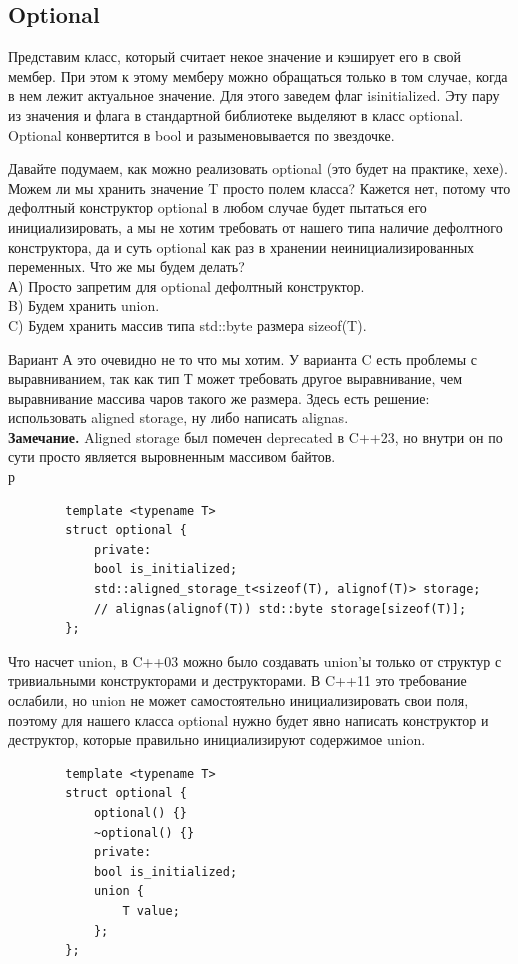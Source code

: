 \documentclass[12pt, a4paper]{article}
\begin{document}
	\subsection{Optional}
	Представим класс, который считает некое значение и кэширует его в свой мембер. При этом к этому мемберу можно обращаться только в том случае, когда в нем лежит актуальное значение. Для этого заведем флаг is\textunderscore initialized. Эту пару из значения и флага в стандартной библиотеке выделяют в класс optional. Optional конвертится в bool и разыменовывается по звездочке.
	\par Давайте подумаем, как можно реализовать optional (это будет на практике, хехе). Можем ли мы хранить значение T просто полем класса? Кажется нет, потому что дефолтный конструктор optional в любом случае будет пытаться его инициализировать, а мы не хотим требовать от нашего типа наличие дефолтного конструктора, да и суть optional как раз в хранении неинициализированных переменных. Что же мы будем делать? \\А) Просто запретим для optional дефолтный конструктор. \\B) Будем хранить union. \\C) Будем хранить массив типа std::byte размера sizeof(T).
	\par Вариант А это очевидно не то что мы хотим. У варианта C есть проблемы с выравниванием, так как тип Т может требовать другое выравнивание, чем выравнивание массива чаров такого же размера. Здесь есть решение: использовать aligned storage, ну либо написать alignas.\\
	\textbf{Замечание.} Aligned storage был помечен deprecated в C++23, но внутри он по сути просто является выровненным массивом байтов.\\р
	\begin{verbatim}
		template <typename T>
		struct optional {
			private:
			bool is_initialized;
			std::aligned_storage_t<sizeof(T), alignof(T)> storage;
			// alignas(alignof(T)) std::byte storage[sizeof(T)];
		};
	\end{verbatim}
	Что насчет union, в C++03 можно было создавать union'ы только от структур с тривиальными конструкторами и деструкторами. В C++11 это требование ослабили, но union не может самостоятельно инициализировать свои поля, поэтому для нашего класса optional нужно будет явно написать конструктор и деструктор, которые правильно инициализируют содержимое union.
	\begin{verbatim}
		template <typename T>
		struct optional {
			optional() {}
			~optional() {}
			private:
			bool is_initialized;
			union {
				T value;
			};
		};
	\end{verbatim}
\end{document}
